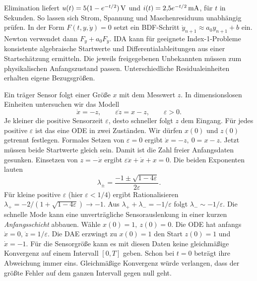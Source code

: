 Elimination liefert \(u(t)=5(1-e^{-t/2})\,\mathrm{V}\) und \(i(t)=2{,}5e^{-t/2}\,\mathrm{mA}\), für \(t\) in Sekunden. So lassen sich Strom, Spannung und Maschenresiduum unabhängig prüfen.
In der Form \(F(t,y,\dot y)=0\) setzt ein BDF-Schritt \(\dot y_{n+1}\approx a_0y_{n+1}+b\) ein. Newton verwendet dann \(F_y+a_0F_{\dot y}\). IDA kann für geeignete Index-1-Probleme konsistente algebraische Startwerte und Differentialableitungen aus einer Startschätzung ermitteln. Die jeweils freigegebenen Unbekannten müssen zum physikalischen Anfangszustand passen. Unterschiedliche Residualeinheiten erhalten eigene Bezugsgrößen.

Ein träger Sensor folgt einer Größe \(x\) mit dem Messwert \(z\). In dimensionslosen Einheiten untersuchen wir das Modell
\[
 \dot x=-z,\qquad \varepsilon\dot z=x-z,\qquad \varepsilon>0.
\]
Je kleiner die positive Sensorzeit \(\varepsilon\), desto schneller folgt \(z\) dem Eingang. Für jedes positive \(\varepsilon\) ist das eine ODE in zwei Zuständen. Wir dürfen \(x(0)\) und \(z(0)\) getrennt festlegen. Formales Setzen von \(\varepsilon=0\) ergibt \(\dot x=-z,\ 0=x-z\). Jetzt müssen beide Startwerte gleich sein. Damit ist die Zahl freier Anfangsdaten gesunken.
Einsetzen von \(z=-\dot x\) ergibt \(\varepsilon\ddot x+\dot x+x=0\). Die beiden Exponenten lauten
\[
 \lambda_{\pm}=\frac{-1\pm\sqrt{1-4\varepsilon}}{2\varepsilon}.
\]
Für kleine positive \(\varepsilon\) (hier \(\varepsilon<1/4\)) ergibt Rationalisieren \(\lambda_+=-2/(1+\sqrt{1-4\varepsilon})\to-1\). Aus \(\lambda_++\lambda_-=-1/\varepsilon\) folgt \(\lambda_-\sim-1/\varepsilon\). Die schnelle Mode kann eine unverträgliche Sensorauslenkung in einer kurzen \emph{Anfangsschicht} abbauen.
Wähle \(x(0)=1,\ z(0)=0\). Die ODE hat anfangs \(\dot x=0\), \(\dot z=1/\varepsilon\). Die DAE erzwingt zu \(x(0)=1\) den Start \(z(0)=1\) und \(\dot x=-1\). Für die Sensorgröße kann es mit diesen Daten keine gleichmäßige Konvergenz auf einem Intervall \([0,T]\) geben. Schon bei \(t=0\) beträgt ihre Abweichung immer eins. Gleichmäßige Konvergenz würde verlangen, dass der größte Fehler auf dem ganzen Intervall gegen null geht.

